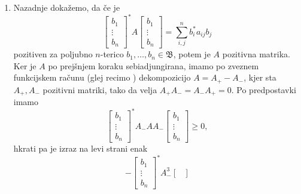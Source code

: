 \begin{dokaz}
\begin{enumerate}
\begin{align*}
            &= \sum_{i, j} ^n b_j ^* a_{ij}^* b_i\\
            &=  \sum_{i, j} ^n b_i ^* a_{ji}^* b_j,
        \end{align*}
        od koder sledi
        $$\begin{bmatrix}
        b_1 \\ \vdots \\ b_n
    \end{bmatrix}^* (A - A^*) \begin{bmatrix}
        b_1 \\ \vdots \\ b_n
    \end{bmatrix} = \sum_{i, j} ^n b_i ^* (a_{ij} - a_{ji}^*) b_i = 0.$$ Po prvemu koraku tako dobimo $A - A^* = 0$.
        \item Nazadnje dokažemo, da če je $$\begin{bmatrix}
            b_1 \\ \vdots \\ b_n
        \end{bmatrix}^* A \begin{bmatrix}
            b_1 \\ \vdots \\ b_n
        \end{bmatrix} = \sum_{i, j} ^n b_i ^* a_{ij} b_j$$
        pozitiven za poljubno $n$-terico $b_1, \dots, b_n \in \mathfrak{B}$, potem je $A$ pozitivna matrika.
        Ker je $A$ po prejšnjem koraku sebiadjungirana, imamo po zveznem funkcijskem računu (glej recimo \cite[Section VIII.2, str. 236-240]{conway1990}) 
        dekompozicijo $A = A_+ - A_-$,
        kjer sta $A_+, A_-$ pozitivni matriki, tako da velja $A_+ A_- = A_- A_+ = 0$.
        Po predpostavki imamo
        $$\begin{bmatrix}
            b_1 \\ \vdots \\ b_n
        \end{bmatrix}^* A_- A A_- \begin{bmatrix}
            b_1 \\ \vdots \\ b_n
        \end{bmatrix}\geq 0,$$
        hkrati pa je izraz na levi strani enak
        $$- \begin{bmatrix}
            b_1 \\ \vdots \\ b_n
        \end{bmatrix}^* A_- ^3 \begin{bmatrix}

\end{bmatrix}$$
\end{enumerate}
\end{dokaz}
